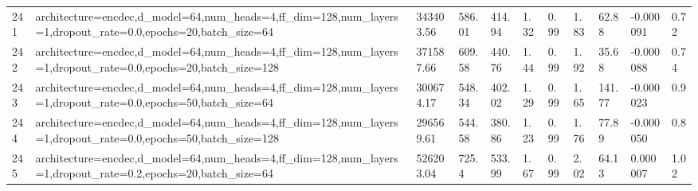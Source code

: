 \begin{longtable}{C{0.8cm} L{2cm} C{1.15cm} C{1.15cm} C{1.15cm} C{1.15cm} C{0.85cm} C{1.25cm} C{1.2cm} C{1.5cm} C{1.0cm}}
241 & architecture=encdec,\newline d\_model=64,\newline num\_heads=4,\newline ff\_dim=128,\newline num\_layers=1,\newline dropout\_rate=0.0,\newline epochs=20,\newline batch\_size=64 & 343403.56 & 586.01 & 414.94 & 1.32 & 0.99 & 1.83 & 62.88 & -0.000091 & 0.72 \\
242 & architecture=encdec,\newline d\_model=64,\newline num\_heads=4,\newline ff\_dim=128,\newline num\_layers=1,\newline dropout\_rate=0.0,\newline epochs=20,\newline batch\_size=128 & 371587.66 & 609.58 & 440.76 & 1.44 & 0.99 & 1.92 & 35.68 & -0.000088 & 0.74 \\
243 & architecture=encdec,\newline d\_model=64,\newline num\_heads=4,\newline ff\_dim=128,\newline num\_layers=1,\newline dropout\_rate=0.0,\newline epochs=50,\newline batch\_size=64 & 300674.17 & 548.34 & 402.02 & 1.29 & 0.99 & 1.65 & 141.77 & -0.000023 & 0.9 \\
244 & architecture=encdec,\newline d\_model=64,\newline num\_heads=4,\newline ff\_dim=128,\newline num\_layers=1,\newline dropout\_rate=0.0,\newline epochs=50,\newline batch\_size=128 & 296569.61 & 544.58 & 380.86 & 1.23 & 0.99 & 1.76 & 77.89 & -0.000050 & 0.8 \\
245 & architecture=encdec,\newline d\_model=64,\newline num\_heads=4,\newline ff\_dim=128,\newline num\_layers=1,\newline dropout\_rate=0.2,\newline epochs=20,\newline batch\_size=64 & 526203.04 & 725.4 & 533.99 & 1.67 & 0.99 & 2.02 & 64.13 & 0.000007 & 1.02 \\

\end{longtable}
